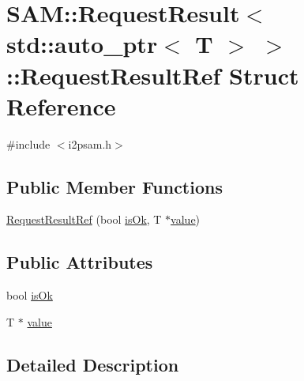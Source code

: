 \hypertarget{struct_s_a_m_1_1_request_result_3_01std_1_1auto__ptr_3_01_t_01_4_01_4_1_1_request_result_ref}{}\section{S\+A\+M\+:\+:Request\+Result$<$ std\+:\+:auto\+\_\+ptr$<$ T $>$ $>$\+:\+:Request\+Result\+Ref Struct Reference}
\label{struct_s_a_m_1_1_request_result_3_01std_1_1auto__ptr_3_01_t_01_4_01_4_1_1_request_result_ref}


{\ttfamily \#include $<$i2psam.\+h$>$}

\subsection*{Public Member Functions}
\begin{DoxyCompactItemize}
\item 
\hyperlink{struct_s_a_m_1_1_request_result_3_01std_1_1auto__ptr_3_01_t_01_4_01_4_1_1_request_result_ref_ae32616615fc6977ef0b8ee208887bf93}{Request\+Result\+Ref} (bool \hyperlink{struct_s_a_m_1_1_request_result_3_01std_1_1auto__ptr_3_01_t_01_4_01_4_1_1_request_result_ref_a4b7e2f67bbf2fabc397502103c5691a2}{is\+Ok}, T $\ast$\hyperlink{struct_s_a_m_1_1_request_result_3_01std_1_1auto__ptr_3_01_t_01_4_01_4_1_1_request_result_ref_aee098e22085d344364e61ee5ced56d71}{value})
\end{DoxyCompactItemize}
\subsection*{Public Attributes}
\begin{DoxyCompactItemize}
\item 
bool \hyperlink{struct_s_a_m_1_1_request_result_3_01std_1_1auto__ptr_3_01_t_01_4_01_4_1_1_request_result_ref_a4b7e2f67bbf2fabc397502103c5691a2}{is\+Ok}
\item 
T $\ast$ \hyperlink{struct_s_a_m_1_1_request_result_3_01std_1_1auto__ptr_3_01_t_01_4_01_4_1_1_request_result_ref_aee098e22085d344364e61ee5ced56d71}{value}
\end{DoxyCompactItemize}


\subsection{Detailed Description}
